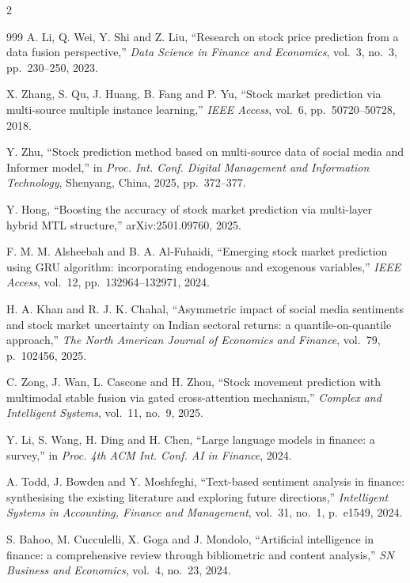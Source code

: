 \begin{footnotesize}
\begin{multicols}{2}
\begin{thebibliography}{999}
 A. Li, Q. Wei, Y. Shi and Z. Liu, ``Research on stock price prediction
from a data fusion perspective,'' \emph{Data Science in Finance and Economics}, vol.~3, no.~3,
pp.~230--250, 2023.

 X. Zhang, S. Qu, J. Huang, B. Fang and P. Yu, ``Stock market prediction via
multi-source multiple instance learning,'' \emph{IEEE Access}, vol.~6, pp.~50720--50728, 2018.

 Y. Zhu, ``Stock prediction method based on multi-source data of social
media and Informer model,'' in \emph{Proc. Int. Conf. Digital Management and Information
Technology}, Shenyang, China, 2025, pp.~372--377.

 Y. Hong, ``Boosting the accuracy of stock market prediction via multi-layer
hybrid MTL structure,'' arXiv:2501.09760, 2025.

 F. M. M. Alsheebah and B. A. Al-Fuhaidi, ``Emerging stock market
prediction using GRU algorithm: incorporating endogenous and exogenous variables,'' \emph{IEEE
Access}, vol.~12, pp.~132964--132971, 2024.

 H. A. Khan and R. J. K. Chahal, ``Asymmetric impact of social media
sentiments and stock market uncertainty on Indian sectoral returns: a quantile-on-quantile
approach,'' \emph{The North American Journal of Economics and Finance}, vol.~79, p.~102456, 2025.

 C. Zong, J. Wan, L. Cascone and H. Zhou, ``Stock movement prediction with
multimodal stable fusion via gated cross-attention mechanism,'' \emph{Complex and Intelligent
Systems}, vol.~11, no.~9, 2025.

 Y. Li, S. Wang, H. Ding and H. Chen, ``Large language models in
finance: a survey,'' in \emph{Proc. 4th ACM Int. Conf. AI in Finance}, 2024.

 A. Todd, J. Bowden and Y. Moshfeghi, ``Text-based sentiment analysis in
finance: synthesising the existing literature and exploring future directions,'' \emph{Intelligent
Systems in Accounting, Finance and Management}, vol.~31, no.~1, p.~e1549, 2024.

 S. Bahoo, M. Cucculelli, X. Goga and J. Mondolo, ``Artificial intelligence in
finance: a comprehensive review through bibliometric and content analysis,'' \emph{SN Business and
Economics}, vol.~4, no.~23, 2024.


\end{thebibliography}
\end{multicols}
\end{footnotesize}
